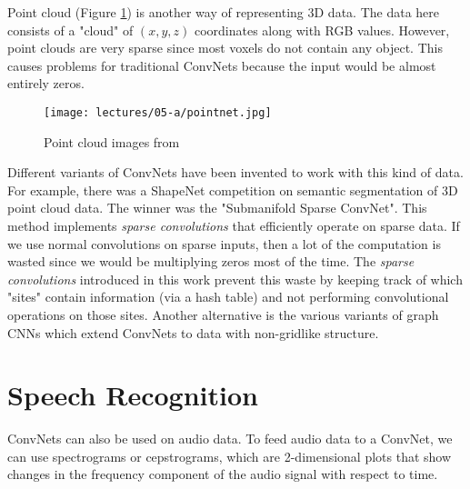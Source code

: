 Point cloud (Figure \ref{fig:pointcloud}) is another way of representing 3D data. The data here consists of a "cloud" of $(x,y,z)$  coordinates along with RGB values. However, point clouds are very sparse since most voxels do not contain any object. This causes problems for traditional ConvNets because the input would be almost entirely zeros.

\begin{figure}[h]
    \centering
    \texttt{[image: lectures/05-a/pointnet.jpg]}
    \caption{Point cloud images from \citep{qi2017pointnet}}
    \label{fig:pointcloud}
\end{figure}
Different variants of ConvNets have been invented to work with this kind of data. For example, there was a ShapeNet competition on semantic segmentation of 3D point cloud data.
The winner was the "Submanifold Sparse ConvNet". This method implements {\it sparse convolutions} that efficiently operate on sparse data. If we use normal convolutions on sparse inputs, then a lot of the computation is wasted since we would be multiplying zeros most of the time. The {\it sparse convolutions} introduced in this work prevent this waste by keeping track of which "sites" contain information (via a hash table) and not performing convolutional operations on those sites. Another alternative is the various variants of graph CNNs which extend ConvNets to data with non-gridlike structure.

\section{Speech Recognition}
ConvNets can also be used on audio data. To feed audio data to a ConvNet, we can use spectrograms or cepstrograms, which are 2-dimensional plots that show changes in the frequency component of the audio signal with respect to time.

